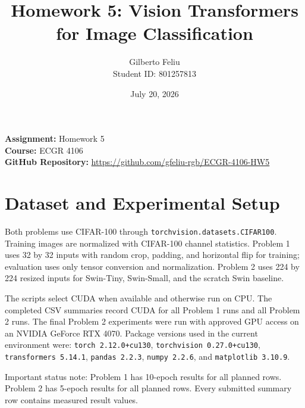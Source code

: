 \documentclass[11pt]{article}
\title{Homework 5: Vision Transformers for Image Classification}
\author{Gilberto Feliu \\ Student ID: 801257813}
\date{July 20, 2026}
\begin{document}
\maketitle

\noindent\textbf{Assignment:} Homework 5 \\
\textbf{Course:} ECGR 4106 \\
\textbf{GitHub Repository:} \url{https://github.com/gfeliu-rgb/ECGR-4106-HW5}

\section*{Dataset and Experimental Setup}
Both problems use CIFAR-100 through \texttt{torchvision.datasets.CIFAR100}. Training images are normalized with CIFAR-100 channel statistics. Problem 1 uses 32 by 32 inputs with random crop, padding, and horizontal flip for training; evaluation uses only tensor conversion and normalization. Problem 2 uses 224 by 224 resized inputs for Swin-Tiny, Swin-Small, and the scratch Swin baseline.

The scripts select CUDA when available and otherwise run on CPU. The completed CSV summaries record CUDA for all Problem 1 runs and all Problem 2 runs. The final Problem 2 experiments were run with approved GPU access on an NVIDIA GeForce RTX 4070. Package versions used in the current environment were: \texttt{torch 2.12.0+cu130}, \texttt{torchvision 0.27.0+cu130}, \texttt{transformers 5.14.1}, \texttt{pandas 2.2.3}, \texttt{numpy 2.2.6}, and \texttt{matplotlib 3.10.9}.

Important status note: Problem 1 has 10-epoch results for all planned rows. Problem 2 has 5-epoch results for all planned rows. Every submitted summary row contains measured result values.
\end{document}
